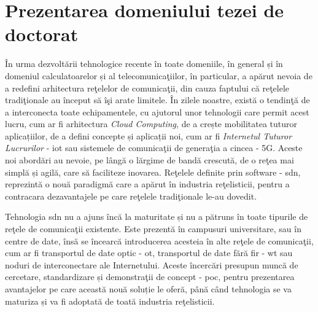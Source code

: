 \section{Prezentarea domeniului tezei de doctorat}

În urma dezvoltării tehnologice recente în toate domeniile, în general și în domeniul calculatoarelor și al telecomunicaţiilor, în particular, a apărut nevoia de a redefini arhitectura reţelelor de comunicaţii, din cauza faptului că reţelele tradiţionale au început să îşi arate limitele. În zilele noastre, există o tendinţă de a interconecta toate echipamentele, cu ajutorul unor tehnologii care permit acest lucru, cum ar fi arhitectura \textit{Cloud Computing}, de a crește mobilitatea tuturor aplicațiilor, de a defini concepte și aplicații noi, cum ar fi \textit{Internetul Tuturor Lucrurilor} - \gls{iot} sau sistemele de comunicaţii de generaţia a cincea - 5G. Aceste noi abordări au nevoie, pe lângă o lărgime de bandă crescută, de o reţea mai simplă și agilă, care să faciliteze inovarea. Reţelele definite prin software - \gls{sdn}, reprezintă o nouă paradigmă care a apărut în industria reţelisticii, pentru a contracara dezavantajele pe care reţelele tradiţionale le-au dovedit.

Tehnologia \gls{sdn} nu a ajuns încă la maturitate și nu a pătruns în toate tipurile de reţele de comunicaţii existente. Este prezentă în campusuri universitare, sau în centre de date, însă se încearcă introducerea acesteia în alte reţele de comunicaţii, cum ar fi transportul de date optic - \gls{ot}, transportul de date fără fir - \gls{wt} sau noduri de interconectare ale Internetului. Aceste încercări presupun muncă de cercetare, standardizare și demonstraţii de concept - \gls{poc}, pentru prezentarea avantajelor pe care această nouă soluție le oferă, până când tehnologia se va maturiza și va fi adoptată de toată industria reţelisticii.